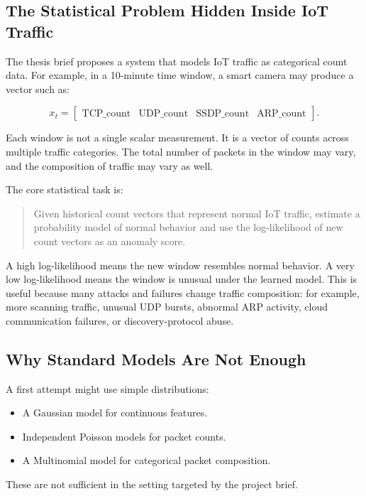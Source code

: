\documentclass[11pt,a4paper]{article}
\begin{document}
\subsection{The Statistical Problem Hidden Inside IoT Traffic}

The thesis brief proposes a system that models IoT traffic as categorical count data. For example, in a 10-minute time window, a smart camera may produce a vector such as:

\[
x_t =
\begin{bmatrix}
\mathrm{TCP\_count} & \mathrm{UDP\_count} & \mathrm{SSDP\_count} & \mathrm{ARP\_count}
\end{bmatrix}.
\]

Each window is not a single scalar measurement. It is a vector of counts across multiple traffic categories. The total number of packets in the window may vary, and the composition of traffic may vary as well.

The core statistical task is:

\begin{quote}
Given historical count vectors that represent normal IoT traffic, estimate a probability model of normal behavior and use the log-likelihood of new count vectors as an anomaly score.
\end{quote}

A high log-likelihood means the new window resembles normal behavior. A very low log-likelihood means the window is unusual under the learned model. This is useful because many attacks and failures change traffic composition: for example, more scanning traffic, unusual UDP bursts, abnormal ARP activity, cloud communication failures, or discovery-protocol abuse.

\subsection{Why Standard Models Are Not Enough}

A first attempt might use simple distributions:

\begin{itemize}
  \item A Gaussian model for continuous features.
  \item Independent Poisson models for packet counts.
  \item A Multinomial model for categorical packet composition.
\end{itemize}

These are not sufficient in the setting targeted by the project brief.
\end{document}

